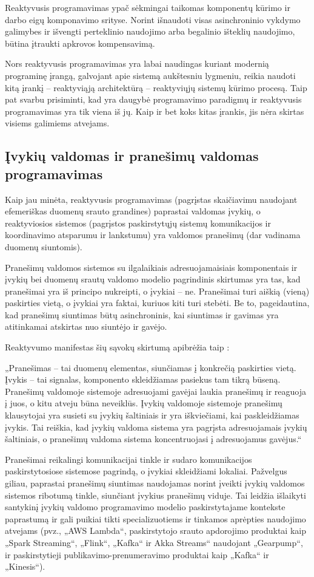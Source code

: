 Reaktyvusis programavimas ypač sėkmingai taikomas komponentų kūrimo ir darbo eigų komponavimo srityse. Norint išnaudoti visas asinchroninio vykdymo galimybes ir išvengti perteklinio naudojimo arba begalinio išteklių naudojimo, būtina įtraukti apkrovos kompensavimą.

Nors reaktyvusis programavimas yra labai naudingas kuriant modernią programinę įrangą, galvojant apie sistemą aukštesniu lygmeniu, reikia naudoti kitą įrankį – reaktyviąją architektūrą – reaktyviųjų sistemų kūrimo procesą. Taip pat svarbu prisiminti, kad yra daugybė programavimo paradigmų ir reaktyvusis programavimas yra tik viena iš jų. Kaip ir bet koks kitas įrankis, jis nėra skirtas visiems galimiems atvejams.

\subsection{Įvykių valdomas ir pranešimų valdomas programavimas}

Kaip jau minėta, reaktyvusis programavimas (pagrįstas skaičiavimu naudojant efemeriškas duomenų srauto grandines) paprastai valdomas įvykių, o reaktyviosios sistemos (pagrįstos paskirstytųjų sistemų komunikacijos ir koordinavimo atsparumu ir lankstumu) yra valdomos pranešimų (dar vadinama duomenų siuntomis).

Pranešimų valdomos sistemos su ilgalaikiais adresuojamaisiais komponentais ir įvykių bei duomenų srautų valdomo modelio pagrindinis skirtumas yra tas, kad pranešimai yra iš principo nukreipti, o įvykiai – ne. Pranešimai turi aiškią (vieną) paskirties vietą, o įvykiai yra faktai, kuriuos kiti turi stebėti. Be to, pageidautina, kad pranešimų siuntimas būtų asinchroninis, kai siuntimas ir gavimas yra atitinkamai atskirtas nuo siuntėjo ir gavėjo.

Reaktyvumo manifestas šių sąvokų skirtumą apibrėžia taip \cite{ReactiveManifesto}:

„Pranešimas – tai duomenų elementas, siunčiamas į konkrečią paskirties vietą. Įvykis – tai signalas, komponento skleidžiamas pasiekus tam tikrą būseną. Pranešimų valdomoje sistemoje adresuojami gavėjai laukia pranešimų ir reaguoja į juos, o kitu atveju būna neveiklūs. Įvykių valdomoje sistemoje pranešimų klausytojai yra susieti su įvykių šaltiniais ir yra iškviečiami, kai paskleidžiamas įvykis. Tai reiškia, kad įvykių valdoma sistema yra pagrįsta adresuojamais įvykių šaltiniais, o pranešimų valdoma sistema koncentruojasi į adresuojamus gavėjus.“

Pranešimai reikalingi komunikacijai tinkle ir sudaro komunikacijos paskirstytosiose sistemose pagrindą, o įvykiai skleidžiami lokaliai. Pažvelgus giliau, paprastai pranešimų siuntimas naudojamas norint įveikti įvykių valdomos sistemos ribotumą tinkle, siunčiant įvykius pranešimų viduje. Tai leidžia išlaikyti santykinį įvykių valdomo programavimo modelio paskirstytajame kontekste paprastumą ir gali puikiai tikti specializuotiems ir tinkamos aprėpties naudojimo atvejams (pvz., „AWS Lambda“, paskirstytojo srauto apdorojimo produktai kaip „Spark Streaming“, „Flink“, „Kafka“ ir Akka Streams“ naudojant „Gearpump“, ir paskirstytieji publikavimo-prenumeravimo produktai kaip „Kafka“ ir „Kinesis“).

